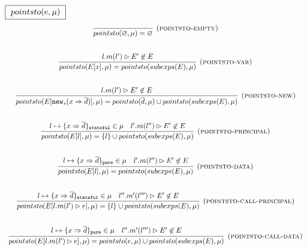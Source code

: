 \documentclass{llncs}
\newcommand{\keywadj}[1]{\mathtt{#1}}
\newcommand{\keyw}[1]{\keywadj{#1}~}
\begin{document}
$\fbox{$~pointsto(e, \mu)~$}$
\[
\begin{array}{c}
\infer[\textsc{(pointsto-empty)}]
  {pointsto(\varnothing, \mu) = \varnothing}
  {}\\[5ex]
\infer[\textsc{(pointsto-var)}]
  {pointsto(E[x],\mu) = pointsto(subexps(E), \mu)}
  {l.m(l') \rhd E' \not\in E}\\[5ex]
\infer[\textsc{(pointsto-new)}]
  {pointsto(E[\keywadj{new}_{s}(x \Rightarrow \overline{d})],\mu) = pointsto(\overline{d},\mu) \cup pointsto(subexps(E), \mu)}
  {l.m(l') \rhd E' \not\in E}\\[5ex]

%
%
%

\infer[\textsc{(pointsto-principal)}]
  {pointsto(E[l],\mu) = \{ l \} \cup pointsto(subexps(E), \mu)}
  {l \mapsto \{ x \Rightarrow \overline{d} \}_\keywadj{stateful} \in \mu & l'.m(l'') \rhd E' \not\in E}\\[5ex]
\infer[\textsc{(pointsto-data)}]
  {pointsto(E[l],\mu) = pointsto(subexps(E), \mu)}
  {l \mapsto \{ x \Rightarrow \overline{d} \}_\keywadj{pure} \in \mu & l'.m(l'') \rhd E' \not\in E}\\[5ex]

\infer[\textsc{(pointsto-call-principal)}]
  {pointsto(E[l.m(l') \rhd e],\mu) = \{ l \} \cup pointsto(subexps(E), \mu)}
  {l \mapsto \{ x \Rightarrow \overline{d} \}_\keywadj{stateful} \in \mu & l''.m'(l''') \rhd E' \not\in E}\\[5ex]

\infer[\textsc{(pointsto-call-data)}]
  {pointsto(E[l.m(l') \rhd e],\mu) = pointsto(e,\mu) \cup pointsto(subexps(E), \mu)}
  {l \mapsto \{ x \Rightarrow \overline{d} \}_\keywadj{pure} \in \mu & l''.m'(l''') \rhd E' \not\in E}\\[5ex]


\end{array}
\]
\end{document}
